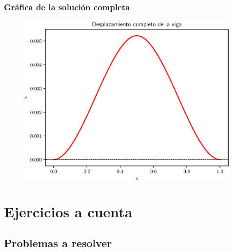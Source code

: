 \documentclass[12pt]{beamer}
\begin{document}
\begin{frame}
\frametitle{Gráfica de la solución completa}
\begin{figure}
    \centering
    \includegraphics[scale=0.55]{Imagenes/plot_CDF_Dif_Fin_Ejercicio_02_02.eps}
\end{figure}
\end{frame}

\section{Ejercicios a cuenta}
\subsection{Problemas a resolver}
\end{document}
